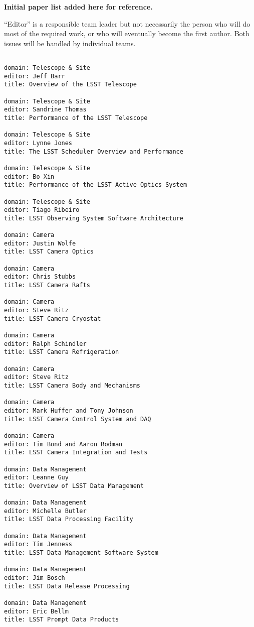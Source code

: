\appendix{}

{\bf Initial paper list added here for reference.}  

``Editor'' is a responsible team leader but not necessarily the person who will do most of 
the required work, or who will eventually become the first author. Both issues will be 
handled by individual teams. 

\begin{verbatim}

domain: Telescope & Site
editor: Jeff Barr
title: Overview of the LSST Telescope

domain: Telescope & Site
editor: Sandrine Thomas 
title: Performance of the LSST Telescope

domain: Telescope & Site
editor: Lynne Jones
title: The LSST Scheduler Overview and Performance 

domain: Telescope & Site
editor: Bo Xin
title: Performance of the LSST Active Optics System  

domain: Telescope & Site
editor: Tiago Ribeiro
title: LSST Observing System Software Architecture

domain: Camera 
editor: Justin Wolfe 
title: LSST Camera Optics 

domain: Camera 
editor: Chris Stubbs 
title: LSST Camera Rafts 

domain: Camera 
editor: Steve Ritz 
title: LSST Camera Cryostat

domain: Camera 
editor: Ralph Schindler 
title: LSST Camera Refrigeration

domain: Camera 
editor: Steve Ritz  
title: LSST Camera Body and Mechanisms 

domain: Camera 
editor: Mark Huffer and Tony Johnson
title: LSST Camera Control System and DAQ 

domain: Camera 
editor: Tim Bond and Aaron Rodman 
title: LSST Camera Integration and Tests 

domain: Data Management 
editor: Leanne Guy 
title: Overview of LSST Data Management

domain: Data Management 
editor: Michelle Butler 
title: LSST Data Processing Facility

domain: Data Management 
editor: Tim Jenness
title: LSST Data Management Software System

domain: Data Management 
editor: Jim Bosch 
title: LSST Data Release Processing

domain: Data Management 
editor: Eric Bellm 
title: LSST Prompt Data Products


\end{verbatim}
